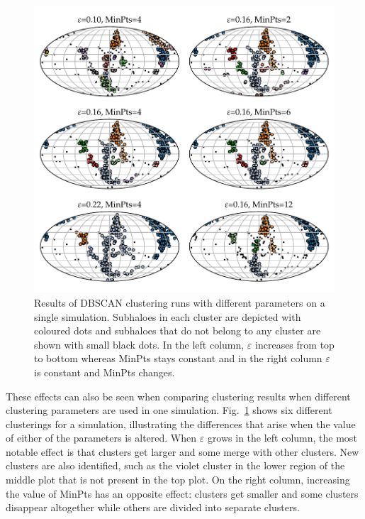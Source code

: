 \documentclass[english, oneside]{HYgradu}
\begin{document}
\begin{figure}
    \centering
    \includegraphics{kuvat/clusteringExamples.pdf}
    \caption{Results of DBSCAN clustering runs with different parameters on a single simulation. Subhaloes in each cluster are depicted with coloured dots and subhaloes that do not belong to any cluster are shown with small black dots. In the left column, $\varepsilon$ increases from top to bottom whereas MinPts stays constant and in the right column $\varepsilon$ is constant and MinPts changes.}\label{fig:clusteringExamples}
\end{figure}

These effects can also be seen when comparing clustering results when different clustering parameters are used in one simulation. Fig.~\ref{fig:clusteringExamples} shows six different clusterings for a simulation, illustrating the differences that arise when the value of either of the parameters is altered. When $\varepsilon$ grows in the left column, the most notable effect is that clusters get larger and some merge with other clusters. New clusters are also identified, such as the violet cluster in the lower region of the middle plot that is not present in the top plot. On the right column, increasing the value of MinPts has an opposite effect: clusters get smaller and some clusters disappear altogether while others are divided into separate clusters.
\end{document}
